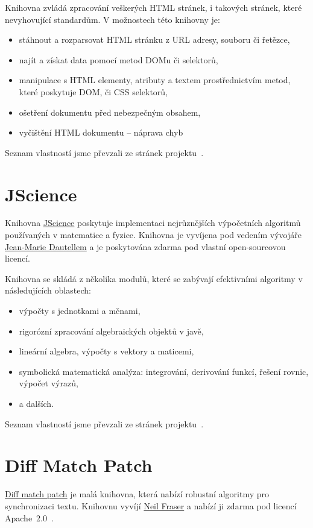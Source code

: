 Knihovna zvládá zpracování veškerých HTML stránek, i takových stránek, které nevyhovující standardům.
V možnostech této knihovny je:
\begin{itemize}
	\item stáhnout a rozparsovat HTML stránku z URL adresy, souboru či řetězce,
	\item najít a získat data pomocí metod DOMu či  selektorů,
	\item manipulace s HTML elementy, atributy a textem prostřednictvím metod, které poskytuje DOM, či CSS selektorů,
	\item ošetření dokumentu před nebezpečným obsahem,
	\item vyčištění HTML dokumentu -- náprava chyb
\end{itemize}
Seznam vlastností jsme převzali ze stránek projektu~\cite{jsoup}.

\section{JScience}
Knihovna \href{http://jscience.org/}{JScience} poskytuje implementaci nejrůznějších výpočetních algoritmů používaných v matematice a fyzice.
Knihovna je vyvíjena pod vedením vývojáře \href{mailto:jean-marie@dautelle.com}{Jean-Marie Dautellem} a je poskytována zdarma pod vlastní open-sourcovou licencí.

Knihovna se skládá z několika modulů, které se zabývají efektivními algoritmy v následujících oblastech:
\begin{itemize}
	\item výpočty s jednotkami a měnami,
	\item rigorózní zpracování algebraických objektů v javě,
	\item lineární algebra, výpočty s vektory a maticemi,
	\item symbolická matematická analýza: integrování, derivování funkcí, řešení rovnic, výpočet výrazů,
	\item a dalších.
\end{itemize}
Seznam vlastností jsme převzali ze stránek projektu~\cite{jscience}.

\section{Diff Match Patch}
\href{http://code.google.com/p/google-diff-match-patch/}{Diff match patch} je malá knihovna, která nabízí robustní algoritmy pro synchronizaci textu.
Knihovnu vyvíjí \href{mailto:root@neil.fraser.name}{Neil Fraser} a nabízí ji zdarma pod licencí Apache~2.0~\cite{apache20}.

